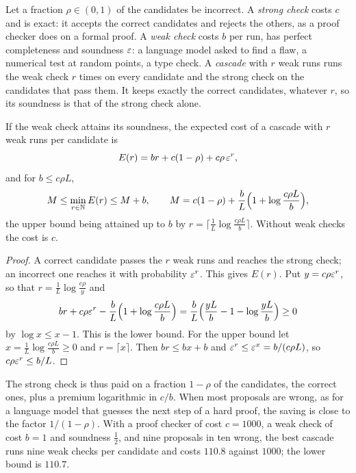 Let a fraction $\rho\in(0,1)$ of the candidates be incorrect. A \emph{strong check} costs $c$ and is exact: it accepts the correct candidates and rejects the others, as a proof checker does on a formal proof. A \emph{weak check} costs $b$ per run, has perfect completeness and soundness $\varepsilon$: a language model asked to find a flaw, a numerical test at random points, a type check. A \emph{cascade} with $r$ weak runs runs the weak check $r$ times on every candidate and the strong check on the candidates that pass them. It keeps exactly the correct candidates, whatever $r$, so its soundness is that of the strong check alone.

\begin{theorem}\label{thm:cascade}
If the weak check attains its soundness, the expected cost of a cascade with $r$ weak runs per candidate is
\[
E(r)=br+c(1-\rho)+c\rho\,\varepsilon^{r},
\]
and for $b\le c\rho L$,
\begin{equation}\label{eq:cascade}
M\le\min_{r\in\mathbb{N}}E(r)\le M+b,\qquad M=c(1-\rho)+\frac bL\Bigl(1+\log\frac{c\rho L}{b}\Bigr),
\end{equation}
the upper bound being attained up to $b$ by $r=\lceil\frac1L\log\frac{c\rho L}{b}\rceil$. Without weak checks the cost is $c$.
\end{theorem}

\begin{proof}
A correct candidate passes the $r$ weak runs and reaches the strong check; an incorrect one reaches it with probability $\varepsilon^{r}$. This gives $E(r)$. Put $y=c\rho\varepsilon^{r}$, so that $r=\frac1L\log\frac{c\rho}{y}$ and
\[
br+c\rho\varepsilon^{r}-\frac bL\Bigl(1+\log\frac{c\rho L}{b}\Bigr)=\frac bL\Bigl(\frac{yL}{b}-1-\log\frac{yL}{b}\Bigr)\ge0
\]
by $\log x\le x-1$. This is the lower bound. For the upper bound let $x=\frac1L\log\frac{c\rho L}{b}\ge0$ and $r=\lceil x\rceil$. Then $br\le bx+b$ and $\varepsilon^{r}\le\varepsilon^{x}=b/(c\rho L)$, so $c\rho\varepsilon^{r}\le b/L$.
\end{proof}

The strong check is thus paid on a fraction $1-\rho$ of the candidates, the correct ones, plus a premium logarithmic in $c/b$. When most proposals are wrong, as for a language model that guesses the next step of a hard proof, the saving is close to the factor $1/(1-\rho)$. With a proof checker of cost $c=1000$, a weak check of cost $b=1$ and soundness $\frac12$, and nine proposals in ten wrong, the best cascade runs nine weak checks per candidate and costs $110.8$ against $1000$; the lower bound is $110.7$.

